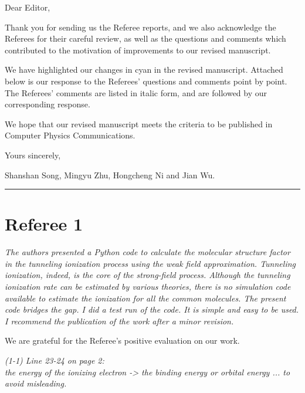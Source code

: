 \documentclass[a4paper,11pt]{article}
\begin{document}
\noindent
Dear Editor,

Thank you for sending us the Referee reports, and we also acknowledge the Referees for their careful review, as well as the questions and comments which contributed to the motivation of improvements to our revised manuscript.

We have highlighted our changes in cyan in the revised manuscript.
Attached below is our response to the Referees' questions and comments point by point.
The Referees' comments are listed in italic form, and are followed by our corresponding response.

We hope that our revised manuscript meets the criteria to be published in Computer Physics Communications.

\hfill
Yours sincerely,

\hfill
Shanshan Song, Mingyu Zhu, Hongcheng Ni and Jian Wu.

\vspace{2em}

\rule{14cm}{0.5pt}

\vspace{2em}


\section*{Referee 1}

\textit{
The authors presented a Python code to calculate the molecular structure factor in the tunneling ionization process using the weak field approximation. Tunneling ionization, indeed, is the core of the strong-field process. Although the tunneling ionization rate can be estimated by various theories, there is no simulation code available to estimate the ionization for all the common molecules. The present code bridges the gap. I did a test run of the code. It is simple and easy to be used. I recommend the publication of the work after a minor revision.
}

\vspace{1em}

We are grateful for the Referee's positive evaluation on our work.

\vspace{2em}


\noindent\textit{
(1-1) Line 23-24 on page 2: \\
the energy of the ionizing electron -> the binding energy or orbital energy ... to avoid misleading.
}
\end{document}
